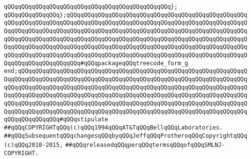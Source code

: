 \verb|qQQqqQQqqQQqqQQqqQQqqQQqqQQqqQQqqQQqqQQqqQQqqQQq};|\newline
\verb|qQQqqQQqqQQqqQQq};qQQqqQQqqQQqqQQqqQQqqQQqqQQqqQQqqQQqqQQqqQQqqQQqqQQqqQQqqQQqqQQqqQQqqQQqqQQqqQQqqQQqqQQqqQQqqQQqqQQqqQQqqQQqqQQqqQQqqQQqqQQqqQQqqQQqqQQqqQQqqQQqqQQqqQQqqQQqqQQqqQQqqQQqqQQqqQQqqQQqqQQqqQQqqQQqqQQqqQQqqQQqqQQqqQQqqQQqqQQqqQQqqQQqqQQqqQQqqQQqqQQqqQQqqQQqqQQqqQQqqQQqqQQqqQQqqQQqqQQqqQQqqQQqqQQqqQQqqQQqqQQqqQQqqQQqqQQqqQQqqQQqqQQqqQQqqQQqqQQqqQQqqQQqqQQqqQQqqQQqqQQqqQQqqQQqqQQqqQQqqQQqqQQqqQQqqQQqqQQqqQQqqQQqqQQqqQQqqQQqqQQq#qQQqpackageqQQqtreecode_form_g|\newline
\verb|end;qQQqqQQqqQQqqQQqqQQqqQQqqQQqqQQqqQQqqQQqqQQqqQQqqQQqqQQqqQQqqQQqqQQqqQQqqQQqqQQqqQQqqQQqqQQqqQQqqQQqqQQqqQQqqQQqqQQqqQQqqQQqqQQqqQQqqQQqqQQqqQQqqQQqqQQqqQQqqQQqqQQqqQQqqQQqqQQqqQQqqQQqqQQqqQQqqQQqqQQqqQQqqQQqqQQqqQQqqQQqqQQqqQQqqQQqqQQqqQQqqQQqqQQqqQQqqQQqqQQqqQQqqQQqqQQqqQQqqQQqqQQqqQQqqQQqqQQqqQQqqQQqqQQqqQQqqQQqqQQqqQQqqQQqqQQqqQQqqQQqqQQqqQQqqQQqqQQqqQQqqQQqqQQqqQQqqQQqqQQqqQQqqQQqqQQqqQQqqQQqqQQqqQQqqQQqqQQqqQQqqQQqqQQqqQQq#qQQqstipulate|\newline
\newline
\newline
\verb|##qQQqCOPYRIGHTqQQq(c)qQQq1994qQQqAT&TqQQqBellqQQqLaboratories.|\newline
\verb|##qQQqSubsequentqQQqchangesqQQqbyqQQqJeffqQQqProtheroqQQqCopyrightqQQq(c)qQQq2010-2015,|\newline
\verb|##qQQqreleasedqQQqperqQQqtermsqQQqofqQQqSMLNJ-COPYRIGHT.|\newline

